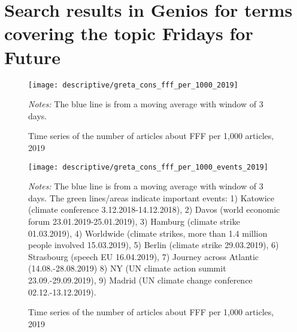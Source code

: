 \documentclass[11pt, a4paper]{article} %
\begin{document}
\newpage
\section{Search results in Genios for terms covering the topic Fridays for Future}


\begin{figure}[H]\centering
	\caption{Time series of the number of articles about FFF per 1,000 articles, 2019}
	\texttt{[image: descriptive/greta\_cons\_fff\_per\_1000\_2019]}
	\begin{minipage}{\linewidth}
		\scriptsize{\emph{Notes:} The blue line is from a moving average with window of 3 days.}
	\end{minipage}
\end{figure}


\begin{figure}[H]\centering
	\caption{Time series of the number of articles about FFF per 1,000 articles, 2019}
	\texttt{[image: descriptive/greta\_cons\_fff\_per\_1000\_events\_2019]}
	\begin{minipage}{\linewidth}
		\scriptsize{\emph{Notes:} The blue line is from a moving average with window of 3 days. The green lines/areas indicate important events: 1) Katowice (climate conference 3.12.2018-14.12.2018), 2) Davos (world economic forum 23.01.2019-25.01.2019), 3) Hamburg (climate strike 01.03.2019), 4) Worldwide (climate strikes, more than 1.4 million people involved 15.03.2019), 5) Berlin (climate strike 29.03.2019), 6) Strasbourg (speech EU 16.04.2019), 7) Journey across Atlantic (14.08.-28.08.2019) 8) NY (UN climate action summit 23.09.-29.09.2019), 9) Madrid (UN climate change conference 02.12.-13.12.2019).}
	\end{minipage}
\end{figure}
\end{document}
